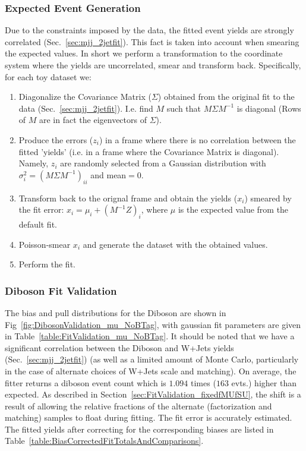 \subsubsection{Expected Event Generation}
\label{sec:FitValidation_ExpectedEventGeneration}
Due to the constraints imposed by the data, the fitted event yields are strongly correlated
(Sec.~\ref{sec:mjj_2jetfit}). This fact is taken into account 
when smearing the expected values. In short we perform a transformation to 
the coordinate system where the yields are uncorrelated, smear and transform back. Specifically,
for each toy dataset we:
\begin{enumerate}
\item Diagonalize the Covariance Matrix ($\Sigma$) obtained from the original fit to the 
data (Sec.~\ref{sec:mjj_2jetfit}). I.e. find $M$ such that $M\Sigma M^{-1}$ is 
diagonal (Rows of $M$ are in fact the eigenvectors of $\Sigma$).
\item Produce the errors ($z_i$) in a frame where there is no correlation between the fitted 
'yields' (i.e. in a frame where the Covariance Matrix is diagonal). Namely, $z_i$ are randomly 
selected from a Gaussian distribution with $\sigma_i^2=(M\Sigma M^{-1})_{ii}$ and mean$=0$.
\item Transform back to the orignal frame and obtain the yields ($x_i$) smeared by the fit error: 
$x_i=\mu_i+(M^{-1}Z)_i$, where $\mu$ is the expected value from the default fit.
\item Poisson-smear $x_i$ and generate the dataset with the obtained values.
\item Perform the fit.
\end{enumerate}


\subsubsection{Diboson Fit Validation}
The bias and pull distributions for the Diboson are shown in
Fig~\ref{fig:DibosonValidation_mu_NoBTag},
with gaussian fit parameters are given in
Table~\ref{table:FitValidation_mu_NoBTag}. It should be noted that
we have a significant correlation
between the Diboson and W+Jets yields (Sec.~\ref{sec:mjj_2jetfit}) (as well as a limited amount
of Monte Carlo, particularly in the case of alternate choices of W+Jets scale and matching).
On average, the fitter returns a diboson event count which is $1.094$ times ($163$ evts.) higher 
than expected. As described in Section~\ref{sec:FitValidation_fixedfMUfSU}, the shift is a result of 
allowing the relative fractions
of the alternate (factorization and matching) samples to float during fitting.
The fit error is accurately estimated. The fitted yields after correcting for the corresponding biases
 are listed in Table~\ref{table:BiasCorrectedFitTotalsAndComparisons}.


